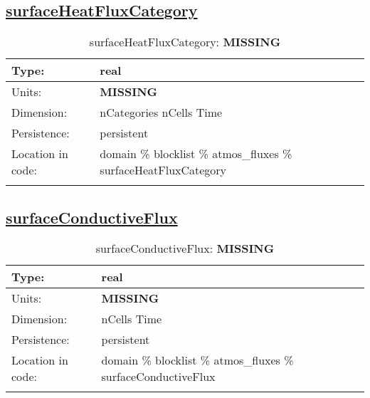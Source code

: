 \subsection[surfaceHeatFluxCategory]{\hyperref[sec:var_tab_atmos_fluxes]{surfaceHeatFluxCategory}}
\label{subsec:var_sec_atmos_fluxes_surfaceHeatFluxCategory}
\begin{center}
\begin{longtable}{| p{2.0in} | p{4.0in} |}
        \hline 
        Type: & real \\
        \hline 
        Units: & {\bf \color{red} MISSING} \\
        \hline 
        Dimension: & nCategories nCells Time \\
        \hline 
        Persistence: & persistent \\
        \hline 
         Location in code: & domain \% blocklist \% atmos\_fluxes \% surfaceHeatFluxCategory \\
         \hline 
    \caption{surfaceHeatFluxCategory: {\bf \color{red} MISSING}}
\end{longtable}
\end{center}
\subsection[surfaceConductiveFlux]{\hyperref[sec:var_tab_atmos_fluxes]{surfaceConductiveFlux}}
\label{subsec:var_sec_atmos_fluxes_surfaceConductiveFlux}
\begin{center}
\begin{longtable}{| p{2.0in} | p{4.0in} |}
        \hline 
        Type: & real \\
        \hline 
        Units: & {\bf \color{red} MISSING} \\
        \hline 
        Dimension: & nCells Time \\
        \hline 
        Persistence: & persistent \\
        \hline 
         Location in code: & domain \% blocklist \% atmos\_fluxes \% surfaceConductiveFlux \\
         \hline 
    \caption{surfaceConductiveFlux: {\bf \color{red} MISSING}}
\end{longtable}
\end{center}
